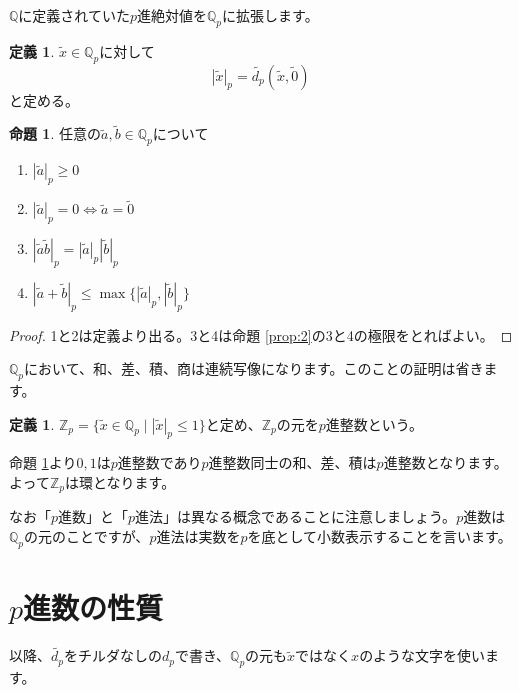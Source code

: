 \documentclass[uplatex]{jsarticle}
\newcommand{\Z}{\mathbb{Z}}
\newcommand{\Q}{\mathbb{Q}}
\theoremstyle{definition} %
\newtheorem{defi}[thm]{定義}
\newtheorem{prop}[thm]{命題}
\begin{document}
$\Q$に定義されていた$p$進絶対値を$\Q_p$に拡張します。

\begin{oframed}\begin{defi}
$\tilde{x} \in \Q_p$に対して
\[|\tilde{x}|_p = \tilde{d_p}(\tilde{x}, \tilde{0})\]
と定める。
\end{defi}\end{oframed}

\begin{oframed}\begin{prop}\label{prop:4}
任意の$\tilde{a}, \tilde{b} \in \Q_p$について
\begin{enumerate}
\item $|\tilde{a}|_p \geq 0$
\item $|\tilde{a}|_p = 0 \iff \tilde{a} = \tilde{0}$
\item $|\tilde{a}\tilde{b}|_p = |\tilde{a}|_p  |\tilde{b}|_p$
\item $|\tilde{a}+\tilde{b}|_p \leq \max\{|\tilde{a}|_p, |\tilde{b}|_p\}$
\end{enumerate}
\end{prop}\end{oframed}
\begin{proof}
1と2は定義より出る。3と4は命題 \ref{prop:2}の3と4の極限をとればよい。
\end{proof}

$\Q_p$において、和、差、積、商は連続写像になります。このことの証明は省きます。

\begin{oframed}\begin{defi}
$\Z_p = \{\tilde{x} \in \Q_p \mid |\tilde{x}|_p \le 1 \}$と定め、$\Z_p$の元を$p$進整数という。
\end{defi}\end{oframed}

命題 \ref{prop:4}より$0, 1$は$p$進整数であり$p$進整数同士の和、差、積は$p$進整数となります。よって$\Z_p$は環となります。

なお「$p$進数」と「$p$進法」は異なる概念であることに注意しましょう。$p$進数は$\Q_p$の元のことですが、$p$進法は実数を$p$を底として小数表示することを言います。

\section{$p$進数の性質}

以降、$\tilde{d_p}$をチルダなしの$d_p$で書き、$\Q_p$の元も$\tilde{x}$ではなく$x$のような文字を使います。
\end{document}
